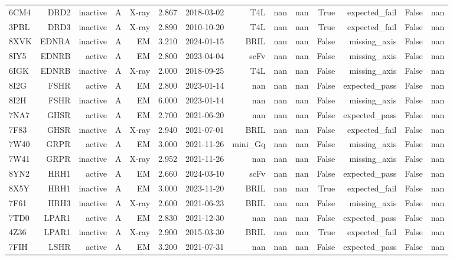 \begin{longtable}{lrrrrrrrrrrrrr}
6CM4 & DRD2 & inactive & A & X-ray & 2.867 & 2018-03-02 & T4L & nan & nan & True & expected\_fail & False & nan \\
3PBL & DRD3 & inactive & A & X-ray & 2.890 & 2010-10-20 & T4L & nan & nan & True & expected\_fail & False & nan \\
8XVK & EDNRA & inactive & A & EM & 3.210 & 2024-01-15 & BRIL & nan & nan & False & missing\_axis & False & nan \\
8IY5 & EDNRB & active & A & EM & 2.800 & 2023-04-04 & scFv & nan & nan & False & missing\_axis & False & nan \\
6IGK & EDNRB & inactive & A & X-ray & 2.000 & 2018-09-25 & T4L & nan & nan & False & missing\_axis & False & nan \\
8I2G & FSHR & active & A & EM & 2.800 & 2023-01-14 & nan & nan & nan & False & expected\_pass & False & nan \\
8I2H & FSHR & inactive & A & EM & 6.000 & 2023-01-14 & nan & nan & nan & False & missing\_axis & False & nan \\
7NA7 & GHSR & active & A & EM & 2.700 & 2021-06-20 & nan & nan & nan & False & expected\_pass & False & nan \\
7F83 & GHSR & inactive & A & X-ray & 2.940 & 2021-07-01 & BRIL & nan & nan & False & expected\_fail & False & nan \\
7W40 & GRPR & active & A & EM & 3.000 & 2021-11-26 & mini\_Gq & nan & nan & False & missing\_axis & False & nan \\
7W41 & GRPR & inactive & A & X-ray & 2.952 & 2021-11-26 & nan & nan & nan & False & missing\_axis & False & nan \\
8YN2 & HRH1 & active & A & EM & 2.660 & 2024-03-10 & scFv & nan & nan & False & expected\_pass & False & nan \\
8X5Y & HRH1 & inactive & A & EM & 3.000 & 2023-11-20 & BRIL & nan & nan & True & expected\_fail & False & nan \\
7F61 & HRH3 & inactive & A & X-ray & 2.600 & 2021-06-23 & BRIL & nan & nan & False & missing\_axis & False & nan \\
7TD0 & LPAR1 & active & A & EM & 2.830 & 2021-12-30 & nan & nan & nan & False & expected\_pass & False & nan \\
4Z36 & LPAR1 & inactive & A & X-ray & 2.900 & 2015-03-30 & BRIL & nan & nan & True & expected\_fail & False & nan \\
7FIH & LSHR & active & A & EM & 3.200 & 2021-07-31 & nan & nan & nan & False & expected\_pass & False & nan \\

\end{longtable}
